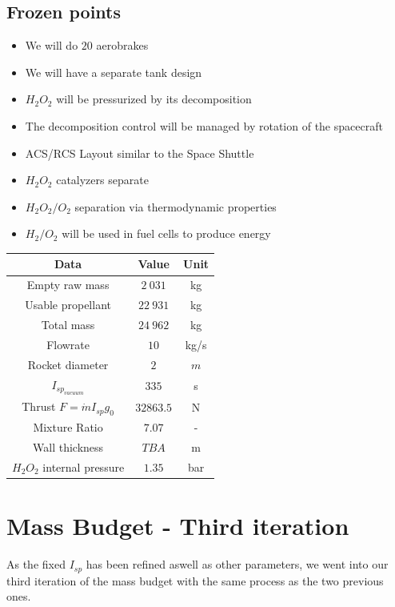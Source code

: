 \subsection{Frozen points}
\begin{itemize}
	\item We will do $20$ aerobrakes
	\item We will have a separate tank design
	\item $H_2O_2$ will be pressurized by its decomposition
	\item The decomposition control will be managed by rotation of the spacecraft
	\item ACS/RCS Layout similar to the Space Shuttle
	\item $H_2O_2$ catalyzers separate
	\item $H_2O_2/O_2$ separation via thermodynamic properties
	\item $H_2/O_2$ will be used in fuel cells to produce energy
\end{itemize}
\begin{center}
	\begin{tabular}[H]{|c|c|c|}
		\hline
		\cellcolor{gray!50}Data & \cellcolor{gray!50}Value & \cellcolor{gray!50}Unit\\
		\hline
		Empty raw mass & $2\ 031$ & kg\\
		\hline
		Usable propellant & $22\ 931$ &kg\\
		\hline
		\cellcolor{green!50}Total mass & \cellcolor{green!50}$24\ 962$ & \cellcolor{green!50}kg\\
		\hline
		Flowrate & $10$ & kg/s\\
		\hline
		Rocket diameter & $2$ & $m$\\
		\hline
		$I_{sp_{vacuum}}$ & $335$ & s\\
		\hline
		Thrust $F=\dot m I_{sp} g_0$ & $32 863.5$ &N\\
		\hline
		Mixture Ratio & $7.07$ & -\\
		\hline
		Wall thickness & $TBA$ & m\\
		\hline
		$H_2O_2$ internal pressure & $1.35$ & bar\\
		\hline
	\end{tabular}
\end{center}
\newpage
\section{Mass Budget - Third iteration}
As the fixed $I_{sp}$ has been refined aswell as other parameters, we went into our third iteration of the mass budget with the same process as the two previous ones.

